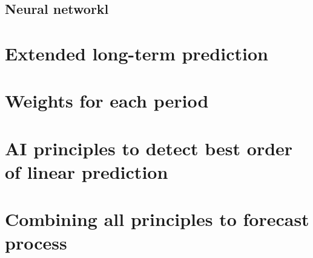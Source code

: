     \subsection{Neural networkl} \label{subsec:neural}
\section{Extended long-term prediction} \label{sec:extlonglp}
\section{Weights for each period} \label{sec:weights}
\section{AI principles to detect best order of linear prediction} \label{sec:aiprincipoles}
\section{Combining all principles to forecast process} \label{subsec:combining_models}
